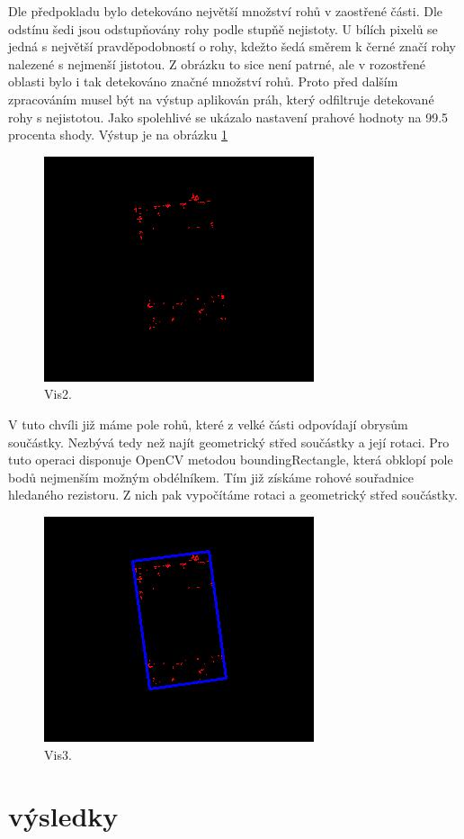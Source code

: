 Dle předpokladu bylo detekováno největší množství rohů v zaostřené části. Dle odstínu šedi jsou odstupňovány rohy podle stupňě nejistoty. U bílích pixelů se jedná s největší pravděpodobností o rohy, kdežto šedá směrem k černé značí rohy nalezené s nejmenší jistotou.  Z obrázku to sice není patrné, ale v rozostřené oblasti bylo i tak detekováno značné množství rohů. Proto před dalším zpracováním musel být na výstup aplikován práh, který odfiltruje detekované rohy s nejistotou. Jako spolehlivé se ukázalo nastavení prahové hodnoty na 99.5 procenta shody. Výstup je na obrázku \ref{fig:vis2}

\begin{figure}[h!]
  \centering
    \includegraphics[width=0.4\linewidth]{obrazky/vis_2.png}%
    \caption{Vis2.}
    \label{fig:vis2}
\end{figure}

V tuto chvíli již máme pole rohů, které z velké části odpovídají obrysům součástky. Nezbývá tedy než najít geometrický střed součástky a její rotaci. Pro tuto operaci disponuje OpenCV metodou boundingRectangle, která obklopí pole bodů nejmenším možným obdélníkem. Tím již získáme rohové souřadnice hledaného rezistoru. Z nich pak vypočítáme rotaci a geometrický střed součástky.

\begin{figure}[h!]
  \centering
    \includegraphics[width=0.4\linewidth]{obrazky/vis_3.png}%
    \caption{Vis3.}
    \label{fig:vis3}
\end{figure}

\section{výsledky}





